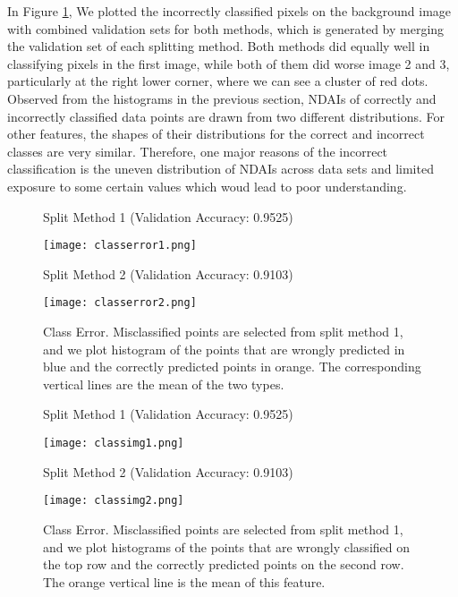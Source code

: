 \documentclass[letterpaper,11pt]{article}
\begin{document}
In Figure \ref{fig:misclass}, We plotted the incorrectly classified pixels on the background image with combined validation sets for both methods, which is generated by merging the validation set of each splitting method. Both methods did equally well in classifying pixels in the first image, while both of them did worse image 2 and 3, particularly at the right lower corner, where we can see a cluster of red dots. Observed from the histograms in the previous section, NDAIs of correctly and incorrectly classified data points are drawn from two different distributions. For other features, the shapes of their distributions for the correct and incorrect classes are very similar. Therefore, one major reasons of the incorrect classification is the uneven distribution of NDAIs across data sets and limited exposure to some certain values which woud lead to poor understanding.  

\begin{figure}[!hbt]
    \centering
    Split Method 1 (Validation Accuracy: 0.9525)
    
    \texttt{[image: classerror1.png]}
    
    Split Method 2 (Validation Accuracy: 0.9103)
    
    \texttt{[image: classerror2.png]}
    \caption{Class Error. Misclassified points are selected from split method 1, and we plot histogram of the points that are wrongly predicted in blue and the correctly predicted points in orange. The corresponding vertical lines are the mean of the two types.}
    \label{fig:misclass}
\end{figure}

\begin{figure}[!hbt]
    \centering
    Split Method 1 (Validation Accuracy: 0.9525)
    
    \texttt{[image: classimg1.png]}
    
    Split Method 2 (Validation Accuracy: 0.9103)

    \texttt{[image: classimg2.png]}
    \caption{Class Error. Misclassified points are selected from split method 1, and we plot histograms of the points that are wrongly classified on the top row and the correctly predicted points on the second row. The orange vertical line is the mean of this feature.}
    \label{fig:classerror}
\end{figure}
\end{document}
